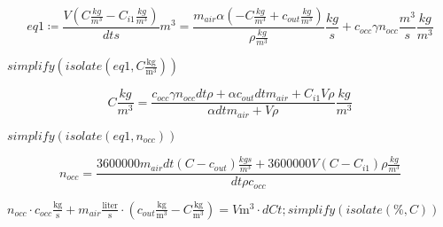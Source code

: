 \documentclass{article}
\begin{document}
\begin{dmath}\label{(1.2.2)}
\mathit{eq1} \coloneqq \frac{V \left(C {\left.\frac{\mathit{kg}}{m^{3}}\right.}-C_{\mathit{i1}} {\left.\frac{\mathit{kg}}{m^{3}}\right.}\right)}{\mathit{dt} {\left.s \right.}} {\left.m^{3}\right.}=\frac{m_{\mathit{air}} \alpha  \left(-C {\left.\frac{\mathit{kg}}{m^{3}}\right.}+c_{\mathit{out}} {\left.\frac{\mathit{kg}}{m^{3}}\right.}\right)}{\rho  {\left.\frac{\mathit{kg}}{m^{3}}\right.}} {\left.\frac{\mathit{kg}}{s}\right.}+c_{\mathit{occ}} \gamma  n_{\mathit{occ}} {\left.\frac{m^{3}}{s}\right.} {\left.\frac{\mathit{kg}}{m^{3}}\right.}
\end{dmath}
\begin{Maple Normal}
{$ \displaystyle \mathit{simplify} (\mathit{isolate} (\mathit{eq1} ,C {\left.\frac{\mathrm{kg}}{\mathrm{m}^{3}}\right.})) $}
\end{Maple Normal}
\begin{dmath}\label{(1.2.3)}
C {\left.\frac{\mathit{kg}}{m^{3}}\right.}=\frac{c_{\mathit{occ}} \gamma  n_{\mathit{occ}} \mathit{dt} \rho +\alpha  c_{\mathit{out}} \mathit{dt} m_{\mathit{air}}+C_{\mathit{i1}} V \rho}{\alpha  \mathit{dt} m_{\mathit{air}}+V \rho} {\left.\frac{\mathit{kg}}{m^{3}}\right.}
\end{dmath}
\begin{Maple Normal}

\end{Maple Normal}
\begin{Maple Normal}
{$ \displaystyle \mathit{simplify} (\mathit{isolate} (\mathit{eq1} ,n_{\mathit{occ}})) $}
\end{Maple Normal}
\begin{dmath}\label{(1.2.4)}
n_{\mathit{occ}}=\frac{3600000 m_{\mathit{air}} \mathit{dt} \left(C -c_{\mathit{out}}\right) {\left.\frac{\mathit{kg} s}{m^{3}}\right.}+3600000 V \left(C -C_{\mathit{i1}}\right) \rho  {\left.\frac{\mathit{kg}}{m^{3}}\right.}}{\mathit{dt} \rho  c_{\mathit{occ}}}
\end{dmath}
\begin{Maple Normal}
{$ \displaystyle n_{\mathit{occ}}\cdot c_{\mathit{occ}}{\left.\frac{\mathrm{kg}}{\mathrm{s}}\right.}+m_{\mathit{air}}{\left.\frac{\mathrm{liter}}{\mathrm{s}}\right.}\cdot (c_{\mathit{out}}{\left.\frac{\mathrm{kg}}{\mathrm{m}^{3}}\right.}-C {\left.\frac{\mathrm{kg}}{\mathrm{m}^{3}}\right.})=V {\left.\mathrm{m}^{3}\right.}\cdot \mathit{dCt} ;\mathit{simplify} (\mathit{isolate} (\% ,C)) $}
\end{Maple Normal}
\end{document}
